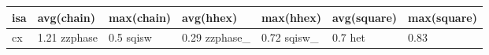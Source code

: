 \begin{tabular}{lllllll}
\toprule
isa & avg(chain) & max(chain) & avg(hhex) & max(hhex) & avg(square) & max(square) \\
\midrule
cx & 1.21%
zzphase & 0.5%
sqisw & 0.29%
zzphase_ & 0.72%
sqisw_ & 0.7%
het & 0.83%
\bottomrule
\end{tabular}
